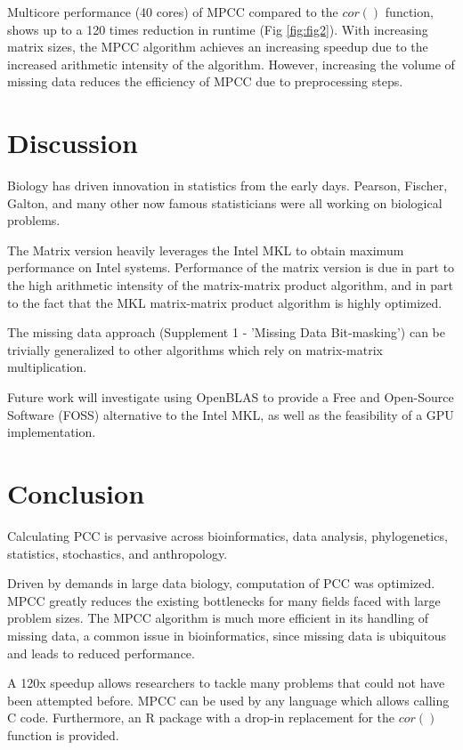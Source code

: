 \documentclass{bioinfo}
\begin{document}
Multicore performance (40 cores) of MPCC compared to the $cor()$
function, shows up to a 120 times reduction in runtime
(Fig \ref{fig:fig2}). With increasing matrix sizes, the MPCC algorithm
achieves an increasing speedup due to the increased arithmetic
intensity of the algorithm. However, increasing the volume of missing
data reduces the efficiency of MPCC due to preprocessing steps.

\vspace*{-5mm}
\section{Discussion}

Biology has driven innovation in statistics from the early
days. Pearson, Fischer, Galton, and many other now famous
statisticians were all working on biological problems.

The Matrix version heavily leverages the Intel\textregistered{} MKL to
obtain maximum performance on Intel\textregistered{}
systems. Performance of the matrix version is due in part to the high
arithmetic intensity of the matrix-matrix product algorithm, and in
part to the fact that the MKL matrix-matrix product algorithm is
highly optimized.

The missing data approach (Supplement 1 - 'Missing Data Bit-masking')
can be trivially generalized to other algorithms which rely on
matrix-matrix multiplication.

Future work will investigate using OpenBLAS to provide a Free and
Open-Source Software (FOSS) alternative to the Intel\textregistered{}
MKL, as well as the feasibility of a GPU implementation.
\vspace*{-5mm}

\section{Conclusion}

Calculating PCC is pervasive across bioinformatics, data
analysis, phylogenetics, statistics, stochastics, and anthropology.

Driven by demands in large data biology, computation of PCC was
optimized.  MPCC greatly reduces the existing bottlenecks for many
fields faced with large problem sizes. The MPCC algorithm is much more
efficient in its handling of missing data, a common issue in
bioinformatics, since missing data is ubiquitous and leads to reduced
performance.

A 120x speedup allows researchers to tackle many problems that could
not have been attempted before. MPCC can be used by any language which
allows calling C code. Furthermore, an R package with a drop-in
replacement for the $cor()$ function is provided.
\end{document}
